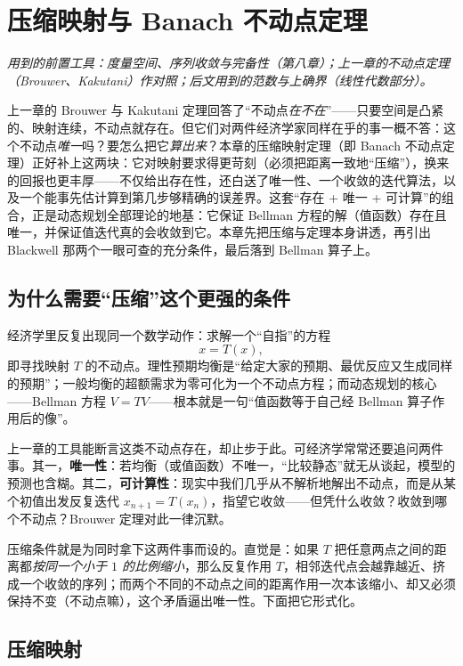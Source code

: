 \chapter{压缩映射与 Banach 不动点定理}
\label{ch:contraction}

\noindent\emph{用到的前置工具：度量空间、序列收敛与完备性（第八章）；上一章的不动点定理（Brouwer、Kakutani）作对照；后文用到的范数与上确界（线性代数部分）。}
\medskip

上一章的 Brouwer 与 Kakutani 定理回答了``不动点\emph{在不在}''——只要空间是凸紧的、映射连续，不动点就存在。但它们对两件经济学家同样在乎的事一概不答：这个不动点\emph{唯一}吗？要怎么把它\emph{算出来}？本章的压缩映射定理（即 Banach 不动点定理）正好补上这两块：它对映射要求得更苛刻（必须把距离一致地``压缩''），换来的回报也更丰厚——不仅给出存在性，还白送了唯一性、一个收敛的迭代算法，以及一个能事先估计算到第几步够精确的误差界。这套``存在 + 唯一 + 可计算''的组合，正是动态规划全部理论的地基：它保证 Bellman 方程的解（值函数）存在且唯一，并保证值迭代真的会收敛到它。本章先把压缩与定理本身讲透，再引出 Blackwell 那两个一眼可查的充分条件，最后落到 Bellman 算子上。

\section{为什么需要``压缩''这个更强的条件}
\label{sec:contraction-motivation}

经济学里反复出现同一个数学动作：求解一个``自指''的方程
\[
    x = T(x),
\]
即寻找映射 $T$ 的不动点。理性预期均衡是``给定大家的预期、最优反应又生成同样的预期''；一般均衡的超额需求为零可化为一个不动点方程；而动态规划的核心——Bellman 方程 $V=TV$——根本就是一句``值函数等于自己经 Bellman 算子作用后的像''。

上一章的工具能断言这类不动点存在，却止步于此。可经济学常常还要追问两件事。其一，\textbf{唯一性}：若均衡（或值函数）不唯一，``比较静态''就无从谈起，模型的预测也含糊。其二，\textbf{可计算性}：现实中我们几乎从不解析地解出不动点，而是从某个初值出发反复迭代 $x_{n+1}=T(x_n)$，指望它收敛——但凭什么收敛？收敛到哪个不动点？Brouwer 定理对此一律沉默。

压缩条件就是为同时拿下这两件事而设的。直觉是：如果 $T$ 把任意两点之间的距离都\emph{按同一个小于 $1$ 的比例缩小}，那么反复作用 $T$，相邻迭代点会越靠越近、挤成一个收敛的序列；而两个不同的不动点之间的距离作用一次本该缩小、却又必须保持不变（不动点嘛），这个矛盾逼出唯一性。下面把它形式化。

\section{压缩映射}
\label{sec:contraction-def}

